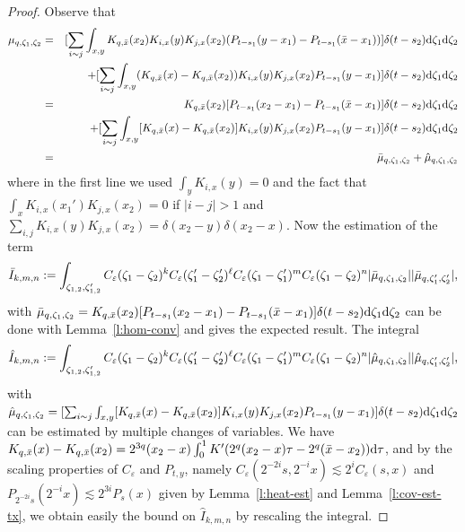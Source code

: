 \begin{appendices}
\begin{proof}
  Observe that
  \begin{eqnarray*}
    \mu_{q, \zeta_1, \zeta_2} & = & [\sum_{i \sim j} \int_{x, y} K_{q,
    \bar{x}} (x_2) K_{i, x} (y) K_{j, x} (x_2) (P_{t - s_1} (y - x_1) - P_{t -
    s_1} (\bar{x} - x_1))] \delta (t - s_2) \mathrm{d} \zeta_1 \mathrm{d} \zeta_2\\
    &  & + [\sum_{i \sim j} \int_{x, y} (K_{q, \bar{x}} (x) - K_{q, \bar{x}}
    (x_2)) K_{i, x} (y) K_{j, x} (x_2) P_{t - s_1} (y - x_1)] \delta (t - s_2)
    \mathrm{d} \zeta_1 \mathrm{d} \zeta_2\\
    & = & K_{q, \bar{x}} (x_2) [P_{t - s_1} (x_2 - x_1) - P_{t - s_1}
    (\bar{x} - x_1)] \delta (t - s_2) \mathrm{d} \zeta_1 \mathrm{d} \zeta_2\\
    &  & + [\sum_{i \sim j} \int_{x, y} [K_{q, \bar{x}} (x) - K_{q, \bar{x}}
    (x_2)] K_{i, x} (y) K_{j, x} (x_2) P_{t - s_1} (y - x_1)] \delta (t - s_2)
    \mathrm{d} \zeta_1 \mathrm{d} \zeta_2\\
    & = & \bar{\mu}_{q, \zeta_1, \zeta_2} + \hat{\mu}_{q, \zeta_1, \zeta_2}
  \end{eqnarray*}
  where in the first line we used $\int_y K_{i, x} (y) = 0$ and the fact that
  $\int_x K_{i, x} (x_1') K_{j, x} (x_2) = 0$ if $| i - j | > 1$ and $\sum_{i,
  j} K_{i, x} (y) K_{j, x} (x_2) = \delta (x_2 - y) \delta (x_2 - x)$. Now the
  estimation of the term
  \[ \bar{I}_{k, m, n} := \int_{\zeta_{1, 2}, \zeta'_{1, 2}}
     C_{\varepsilon} (\zeta_1 - \zeta_2)^k C_{\varepsilon} (\zeta_1' -
     \zeta'_2)^{\ell} C_{\varepsilon} (\zeta_1 - \zeta'_1)^m C_{\varepsilon}
     (\zeta_1 - \zeta_2)^n | \bar{\mu}_{q, \zeta_1, \zeta_2} | | \bar{\mu}_{q,
     \zeta_1', \zeta_2'} |, \]
  with $\bar{\mu}_{q, \zeta_1, \zeta_2} = K_{q, \bar{x}} (x_2) [P_{t - s_1}
  (x_2 - x_1) - P_{t - s_1} (\bar{x} - x_1)] \delta (t - s_2) \mathrm{d} \zeta_1
  \mathrm{d} \zeta_2$ can be done with Lemma~\ref{l:hom-conv} and gives the
  expected result. The integral
  \[ \hat{I}_{k, m, n} := \int_{\zeta_{1, 2}, \zeta'_{1, 2}}
     C_{\varepsilon} (\zeta_1 - \zeta_2)^k C_{\varepsilon} (\zeta_1' -
     \zeta'_2)^{\ell} C_{\varepsilon} (\zeta_1 - \zeta'_1)^m C_{\varepsilon}
     (\zeta_1 - \zeta_2)^n | \hat{\mu}_{q, \zeta_1, \zeta_2} | | \hat{\mu}_{q,
     \zeta_1', \zeta_2'} |, \]
  with $\hat{\mu}_{q, \zeta_1, \zeta_2} = [\sum_{i \sim j} \int_{x, y} [K_{q,
  \bar{x}} (x) - K_{q, \bar{x}} (x_2)] K_{i, x} (y) K_{j, x} (x_2) P_{t - s_1}
  (y - x_1)] \delta (t - s_2) \mathrm{d} \zeta_1 \mathrm{d} \zeta_2$ can be estimated
  by multiple changes of variables. We have $K_{q, \bar{x}} (x) - K_{q,
  \bar{x}} (x_2) = 2^{3 q} (x_2 - x) \int_0^1 K' (2^q (x_2 - x) \tau - 2^q
  (\bar{x} - x_2)) \mathrm{d} \tau$, and by the scaling properties of
  $C_{\varepsilon}$ and $P_{t, y}$, namely $C_{\varepsilon} (2^{- 2 i} s, 2^{-
  i} x) \lesssim 2^i C_{\varepsilon} (s, x)$ and $P_{2^{- 2 i} s} (2^{- i} x)
  \lesssim 2^{3 i} P_s (x)$ given by Lemma~\ref{l:heat-est} and
  Lemma~\ref{l:cov-est-tx}, we obtain easily the bound on $\hat{I}_{k, m, n}$
  by rescaling the integral.
\end{proof}


\end{appendices}
